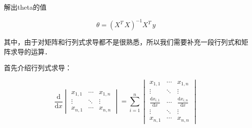 解出theta的值

\begin{equation}
\theta=\left(X^T\,X\right)^{-1}X^T\,y
\end{equation}

其中，由于对矩阵和行列式求导都不是很熟悉，所以我们需要补充一段行列式和矩阵求导的运算．

首先介绍行列式求导：

\begin{equation}
\frac{\mathrm{d}}{\mathrm{d} x}\begin{vmatrix} x_{1,1} & \cdots & x_{1,n} \\ \vdots & \ddots & \vdots \\ x_{n,1} & \cdots & x_{n,n} \end{vmatrix}=\sum_{i=1}^n \begin{vmatrix} x_{1,1} & \cdots & x_{1,n} \\
\vdots & \ddots & \vdots \\ \frac{\mathrm{d} x_{i,1}}{\mathrm{d} x} & \cdots & \frac{\mathrm{d} x_{i,n}}{\mathrm {d} x} \\ \vdots & \ddots & \vdots \\ x_{n,1} & \cdots & x_{n,n} \end{vmatrix}
\end{equation}
